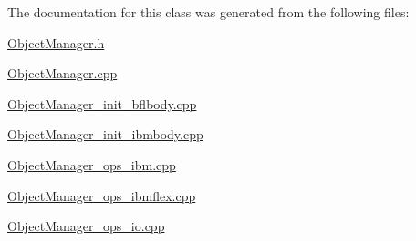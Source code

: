 The documentation for this class was generated from the following files\+:\begin{DoxyCompactItemize}
\item 
\hyperlink{_object_manager_8h}{Object\+Manager.\+h}\item 
\hyperlink{_object_manager_8cpp}{Object\+Manager.\+cpp}\item 
\hyperlink{_object_manager__init__bflbody_8cpp}{Object\+Manager\+\_\+init\+\_\+bflbody.\+cpp}\item 
\hyperlink{_object_manager__init__ibmbody_8cpp}{Object\+Manager\+\_\+init\+\_\+ibmbody.\+cpp}\item 
\hyperlink{_object_manager__ops__ibm_8cpp}{Object\+Manager\+\_\+ops\+\_\+ibm.\+cpp}\item 
\hyperlink{_object_manager__ops__ibmflex_8cpp}{Object\+Manager\+\_\+ops\+\_\+ibmflex.\+cpp}\item 
\hyperlink{_object_manager__ops__io_8cpp}{Object\+Manager\+\_\+ops\+\_\+io.\+cpp}\end{DoxyCompactItemize}
